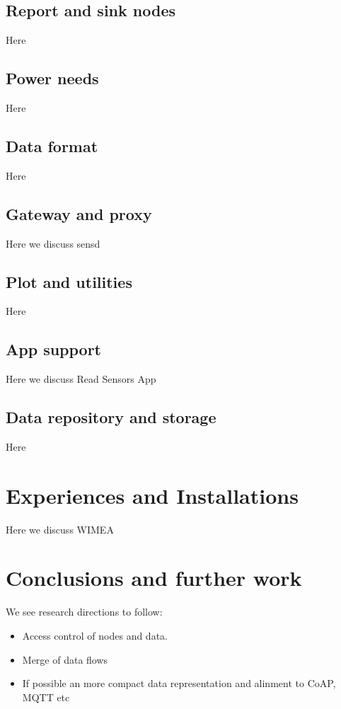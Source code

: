 \documentclass[conference, a4paper,10pt,twocolumn]{IEEEtran}
\begin{document}
\subsection{Report and sink nodes}
Here

\subsection{Power needs}
Here

\subsection{Data format}
Here

\subsection{Gateway and proxy}
Here we discuss sensd ~\cite{sensd}

\subsection{Plot and utilities}
Here

\subsection{App support}
Here we discuss Read Sensors App  ~\cite{read-sensors}

\subsection{Data repository and storage}
Here

\section{Experiences and Installations}
\label{sec:experince}
Here we discuss WIMEA ~\cite{WIMEA}  ~\cite{WIMEAREPORT}

\section{Conclusions and further work}
\label{sec:conclusion}

We see research directions to follow:

\begin{itemize}
\item Access control of nodes and data. 

\item Merge of data flows 

\item If possible an more compact data representation and alinment to CoAP, MQTT etc

\end{itemize}
\end{document}
